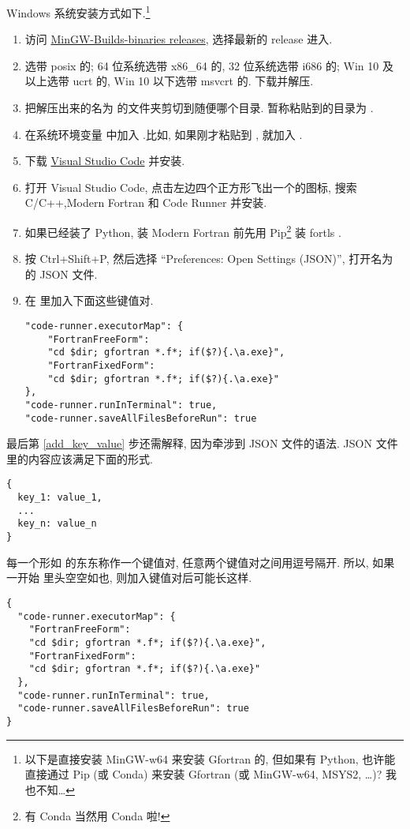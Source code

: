 Windows 系统安装方式如下.\footnote{
    以下是直接安装 MinGW-w64 来安装 Gfortran 的, 但如果有 Python, 也许能直接通过 Pip (或 Conda) 来安装 Gfortran (或 MinGW-w64, MSYS2, \dots)? 我也不知\dots
}
\begin{enumerate}
    \item 访问 \href{https://github.com/niXman/mingw-builds-binaries/releases}
    {MinGW-Builds-binaries releases}, 选择最新的 release 进入.
    \item 选带 posix 的; 64 位系统选带 x86\_{}64 的, 32 位系统选带 i686 的; Win 10 及以上选带 ucrt 的, Win 10 以下选带 msvcrt 的. 下载并解压.
    \item 把解压出来的名为  的文件夹剪切到随便哪个目录. 暂称粘贴到的目录为 \ttt{[dir]}.
    \item 在系统环境变量  中加入 .比如, 如果刚才粘贴到 , 就加入 .
    \item 下载 \href{https://code.visualstudio.com/sha/download?build=stable&os=win32-x64-user}{Visual Studio Code} 并安装.
    \item 打开 Visual Studio Code, 点击左边四个正方形飞出一个的图标, 搜索 C/C++,Modern Fortran 和 Code Runner 并安装.
    \item[] 如果已经装了 Python, 装 Modern Fortran 前先用 Pip\footnote{有 Conda 当然用 Conda 啦!} 装 fortls .
    \item 按 Ctrl+Shift+P, 然后选择 ``Preferences: Open Settings (JSON)'', 打开名为  的 JSON 文件.
    \item 在  里加入下面这些键值对.\label{add_key_value}
    \begin{verbatim}
"code-runner.executorMap": {
    "FortranFreeForm":
    "cd $dir; gfortran *.f*; if($?){.\a.exe}",
    "FortranFixedForm":
    "cd $dir; gfortran *.f*; if($?){.\a.exe}"
},
"code-runner.runInTerminal": true,
"code-runner.saveAllFilesBeforeRun": true
    \end{verbatim}
\end{enumerate}
最后第 \ref{add_key_value} 步还需解释, 因为牵涉到 JSON 文件的语法. JSON 文件里的内容应该满足下面的形式.
\begin{verbatim}
{
  key_1: value_1,
  ...
  key_n: value_n
}
\end{verbatim}
每一个形如  的东东称作一个键值对, 任意两个键值对之间用逗号隔开. 所以, 如果一开始  里头空空如也, 则加入键值对后可能长这样.
\begin{verbatim}
{
  "code-runner.executorMap": {
    "FortranFreeForm":
    "cd $dir; gfortran *.f*; if($?){.\a.exe}",
    "FortranFixedForm":
    "cd $dir; gfortran *.f*; if($?){.\a.exe}"
  },
  "code-runner.runInTerminal": true,
  "code-runner.saveAllFilesBeforeRun": true
}
\end{verbatim}
